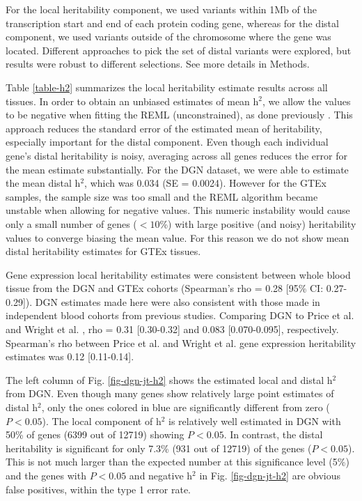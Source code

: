 \documentclass[10pt,letterpaper]{article}
\begin{document}
For the local heritability component, we used variants within 1Mb of the transcription start and end of each protein coding gene, whereas for the distal component, we used variants outside of the chromosome where the gene was located. Different approaches to pick the set of distal variants were explored, but results were robust to different selections. See more details in Methods.

Table \ref{table-h2} summarizes the local heritability estimate results across all tissues. In order to obtain an unbiased estimates of mean h$^2$, we allow the values to be negative when fitting the REML (unconstrained), as done previously \cite{Price_2011,Wright_2014}. This approach reduces the standard error of the estimated mean of heritability, especially important for the distal component. Even though each individual gene's distal heritability is noisy, averaging across all genes reduces the error for the mean estimate substantially. For the DGN dataset, we were able to estimate the mean distal h$^2$, which was 0.034 (SE = 0.0024). However for the GTEx samples, the sample size was too small and the REML algorithm became unstable when allowing for negative values. This numeric instability would cause only a small number of genes ($<10$\%) with large positive (and noisy) heritability values to converge biasing the mean value. For this reason we do not show mean distal heritability estimates for GTEx tissues. 

Gene expression local heritability estimates were consistent between whole blood tissue from the DGN and GTEx cohorts (Spearman's rho = 0.28 [95\% CI: 0.27-0.29]). DGN estimates made here were also consistent with those made in independent blood cohorts from previous studies. Comparing DGN to Price et al. \cite{Price_2011} and Wright et al. \cite{Wright_2014}, rho = 0.31 [0.30-0.32] and 0.083 [0.070-0.095], respectively. Spearman's rho between Price et al. \cite{Price_2011} and Wright et al. \cite{Wright_2014} gene expression heritability estimates was 0.12 [0.11-0.14].

The left column of Fig. \ref{fig-dgn-jt-h2} shows the estimated local and distal h$^2$ from DGN. Even though many genes show relatively large point estimates of distal h$^2$, only the ones colored in blue are significantly different from zero ($P < 0.05$). The local component of h$^2$ is relatively well estimated in DGN with 50\% of genes  (6399 out of 12719) showing $P < 0.05$. %
 In contrast, the distal heritability is significant for only 7.3\% (931 out of 12719) of the genes ($P < 0.05$). This is not much larger than the expected number at this significance level (5\%) and the genes with $P<0.05$ and negative h$^2$ in Fig. \ref{fig-dgn-jt-h2} are obvious false positives, within the type 1 error rate.
\end{document}
